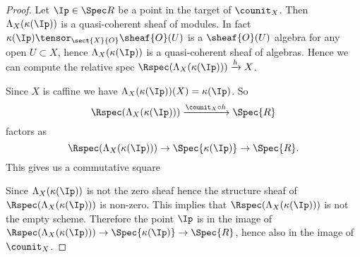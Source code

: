 \begin{proof}
Let $\Ip\in \Spec R$ be a point in the target of $\counit_X$.
Then $\Lambda_X(\kappa(\Ip))$ is a quasi-coherent sheaf of modules.
In fact $\kappa(\Ip)\tensor_{\sect{X}{O}} \sheaf{O}(U)$ is a $\sheaf{O}(U)$ algebra 
for any open $U\subset X$, hence $\Lambda_X(\kappa(\Ip))$ is a quasi-coherent sheaf of algebras.
Hence we can compute the relative spec $\Rspec(\Lambda_X(\kappa(\Ip)))\xrightarrow{h} X$. 

Since $X$ is caffine we have $\Lambda_X(\kappa(\Ip))(X) = \kappa(\Ip)$.
So \[\Rspec(\Lambda_X(\kappa(\Ip)))\xrightarrow{\counit_X \circ h} \Spec{R}\]
factors as \[\Rspec(\Lambda_X(\kappa(\Ip)))\rightarrow \Spec{\kappa(\Ip)} \rightarrow \Spec{R}.\]
This gives us a commutative square

\begin{center}
\end{center}

Since $\Lambda_X(\kappa(\Ip))$ is not the zero sheaf hence the structure sheaf of $\Rspec(\Lambda_X(\kappa(\Ip)))$ is non-zero.
This implies that $\Rspec(\Lambda_X(\kappa(\Ip)))$ is not the empty scheme. 
Therefore the point $\Ip$ is in the image of $\Rspec(\Lambda_X(\kappa(\Ip)))\rightarrow \Spec{\kappa(\Ip)} \rightarrow \Spec{R}$,
hence also in the image of $\counit_X$.
\end{proof}